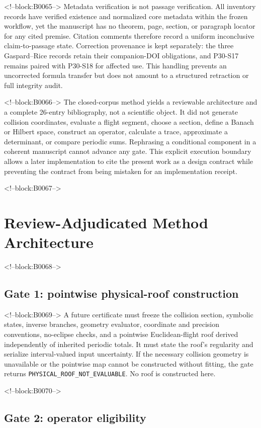 \documentclass[11pt,a4paper]{article}
\begin{document}
<!--block:B0065-->
Metadata verification is not passage verification. All inventory records have verified existence and normalized core metadata within the frozen workflow, yet the manuscript has no theorem, page, section, or paragraph locator for any cited premise. Citation comments therefore record a uniform inconclusive claim-to-passage state. Correction provenance is kept separately: the three Gaspard--Rice records retain their companion-DOI obligations, and P30-S17 remains paired with P30-S18 for affected use. This handling prevents an uncorrected formula transfer but does not amount to a structured retraction or full integrity audit.

<!--block:B0066-->
The closed-corpus method yields a reviewable architecture and a complete 26-entry bibliography, not a scientific object. It did not generate collision coordinates, evaluate a flight segment, choose a section, define a Banach or Hilbert space, construct an operator, calculate a trace, approximate a determinant, or compare periodic sums. Rephrasing a conditional component in a coherent manuscript cannot advance any gate. This explicit execution boundary allows a later implementation to cite the present work as a design contract while preventing the contract from being mistaken for an implementation receipt.

<!--block:B0067-->
\section{Review-Adjudicated Method Architecture}

<!--block:B0068-->
\subsection{Gate 1: pointwise physical-roof construction}

<!--block:B0069-->
A future certificate must freeze the collision section, symbolic states, inverse branches, geometry evaluator, coordinate and precision conventions, no-eclipse checks, and a pointwise Euclidean-flight roof derived independently of inherited periodic totals. It must state the roof's regularity and serialize interval-valued input uncertainty. If the necessary collision geometry is unavailable or the pointwise map cannot be constructed without fitting, the gate returns \texttt{PHYSICAL\_ROOF\_NOT\_EVALUABLE}. No roof is constructed here.

<!--block:B0070-->
\subsection{Gate 2: operator eligibility}
\end{document}
